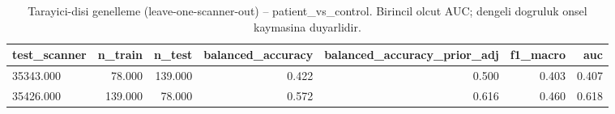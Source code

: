 \begin{table}[htbp]
  \centering
  \caption{Tarayici-disi genelleme (leave-one-scanner-out) -- patient\_vs\_control. Birincil olcut AUC; dengeli dogruluk onsel kaymasina duyarlidir.}
  \label{tab:loso_patient_vs_control}
  \small
  \begin{tabular}{lrrrrrr}
    \toprule
    test\_scanner & n\_train & n\_test & balanced\_accuracy & balanced\_accuracy\_prior\_adj & f1\_macro & auc \\
    \midrule
    35343.000 & 78.000 & 139.000 & 0.422 & 0.500 & 0.403 & 0.407 \\
    35426.000 & 139.000 & 78.000 & 0.572 & 0.616 & 0.460 & 0.618 \\
    \bottomrule
  \end{tabular}
\end{table}
